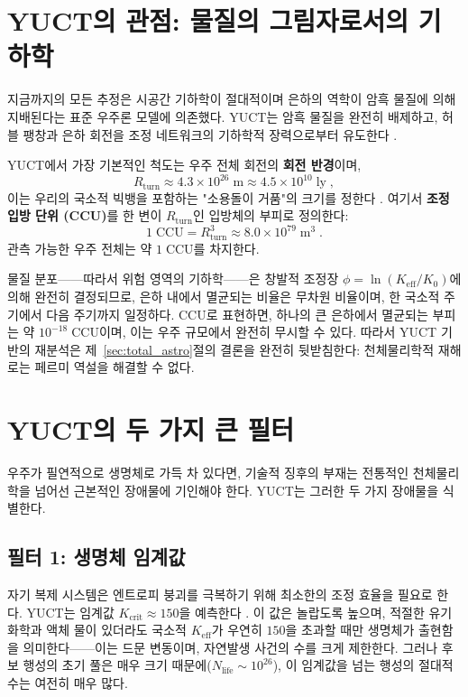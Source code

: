 \documentclass[11pt,a4paper]{article}
\newcommand{\Keff}{K_{\mathrm{eff}}}
\newcommand{\CCU}{\text{CCU}}  %
\begin{document}
	\section{YUCT의 관점: 물질의 그림자로서의 기하학}
	\label{sec:yuct_geometry}
	지금까지의 모든 추정은 시공간 기하학이 절대적이며 은하의 역학이 암흑 물질에 의해 지배된다는 표준 우주론 모델에 의존했다. YUCT는 암흑 물질을 완전히 배제하고, 허블 팽창과 은하 회전을 조정 네트워크의 기하학적 장력으로부터 유도한다 \citep{YUCT,AppGravity}.
	
	YUCT에서 가장 기본적인 척도는 우주 전체 회전의 \textbf{회전 반경}이며,
	\begin{equation}
		R_{\mathrm{turn}} \approx 4.3\times 10^{26}\;\mathrm{m}
		\approx 4.5\times 10^{10}\;\mathrm{ly}\; ,
	\end{equation}
	이는 우리의 국소적 빅뱅을 포함하는 "소용돌이 거품"의 크기를 정한다 \citep{AppOmega}. 여기서 \textbf{조정 입방 단위 (CCU)}를 한 변이 \(R_{\mathrm{turn}}\)인 입방체의 부피로 정의한다:
	\begin{equation}
		1\;\CCU = R_{\mathrm{turn}}^{3} \approx 8.0\times 10^{79}\;\mathrm{m}^{3}\; .
	\end{equation}
	관측 가능한 우주 전체는 약 \(1\;\CCU\)를 차지한다.
	
	물질 분포——따라서 위험 영역의 기하학——은 창발적 조정장 \(\phi = \ln(\Keff/K_{0})\)에 의해 완전히 결정되므로, 은하 내에서 멸균되는 비율은 무차원 비율이며, 한 국소적 주기에서 다음 주기까지 일정하다. CCU로 표현하면, 하나의 큰 은하에서 멸균되는 부피는 약 \(10^{-18}\;\CCU\)이며, 이는 우주 규모에서 완전히 무시할 수 있다. 따라서 YUCT 기반의 재분석은 제~\ref{sec:total_astro}절의 결론을 완전히 뒷받침한다: 천체물리학적 재해로는 페르미 역설을 해결할 수 없다.
	
	\section{YUCT의 두 가지 큰 필터}
	\label{sec:yuct_filters}
	우주가 필연적으로 생명체로 가득 차 있다면, 기술적 징후의 부재는 전통적인 천체물리학을 넘어선 근본적인 장애물에 기인해야 한다. YUCT는 그러한 두 가지 장애물을 식별한다.
	
	\subsection{필터 1: 생명체 임계값}
	\label{sec:filter1}
	자기 복제 시스템은 엔트로피 붕괴를 극복하기 위해 최소한의 조정 효율을 필요로 한다. YUCT는 임계값 \(K_{\mathrm{crit}}\approx 150\)을 예측한다 \citep{AppT}. 이 값은 놀랍도록 높으며, 적절한 유기 화학과 액체 물이 있더라도 국소적 \(K_{\mathrm{eff}}\)가 우연히 \(150\)을 초과할 때만 생명체가 출현함을 의미한다——이는 드문 변동이며, 자연발생 사건의 수를 크게 제한한다. 그러나 후보 행성의 초기 풀은 매우 크기 때문에(\(N_{\mathrm{life}}\sim 10^{26}\)), 이 임계값을 넘는 행성의 절대적 수는 여전히 매우 많다.
	
\end{document}
